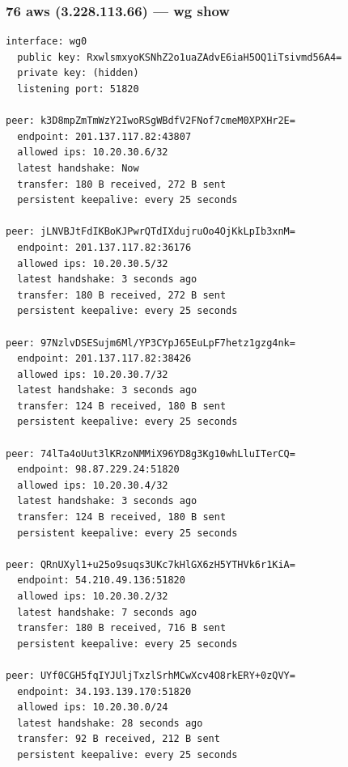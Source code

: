 \documentclass[11pt,a4paper]{article}
\begin{document}
\subsubsection*{76 aws (3.228.113.66) — wg show}
\begin{lstlisting}
interface: wg0
  public key: RxwlsmxyoKSNhZ2o1uaZAdvE6iaH5OQ1iTsivmd56A4=
  private key: (hidden)
  listening port: 51820

peer: k3D8mpZmTmWzY2IwoRSgWBdfV2FNof7cmeM0XPXHr2E=
  endpoint: 201.137.117.82:43807
  allowed ips: 10.20.30.6/32
  latest handshake: Now
  transfer: 180 B received, 272 B sent
  persistent keepalive: every 25 seconds

peer: jLNVBJtFdIKBoKJPwrQTdIXdujruOo4OjKkLpIb3xnM=
  endpoint: 201.137.117.82:36176
  allowed ips: 10.20.30.5/32
  latest handshake: 3 seconds ago
  transfer: 180 B received, 272 B sent
  persistent keepalive: every 25 seconds

peer: 97NzlvDSESujm6Ml/YP3CYpJ65EuLpF7hetz1gzg4nk=
  endpoint: 201.137.117.82:38426
  allowed ips: 10.20.30.7/32
  latest handshake: 3 seconds ago
  transfer: 124 B received, 180 B sent
  persistent keepalive: every 25 seconds

peer: 74lTa4oUut3lKRzoNMMiX96YD8g3Kg10whLluITerCQ=
  endpoint: 98.87.229.24:51820
  allowed ips: 10.20.30.4/32
  latest handshake: 3 seconds ago
  transfer: 124 B received, 180 B sent
  persistent keepalive: every 25 seconds

peer: QRnUXyl1+u25o9suqs3UKc7kHlGX6zH5YTHVk6r1KiA=
  endpoint: 54.210.49.136:51820
  allowed ips: 10.20.30.2/32
  latest handshake: 7 seconds ago
  transfer: 180 B received, 716 B sent
  persistent keepalive: every 25 seconds

peer: UYf0CGH5fqIYJUljTxzlSrhMCwXcv4O8rkERY+0zQVY=
  endpoint: 34.193.139.170:51820
  allowed ips: 10.20.30.0/24
  latest handshake: 28 seconds ago
  transfer: 92 B received, 212 B sent
  persistent keepalive: every 25 seconds

\end{lstlisting}
\end{document}
